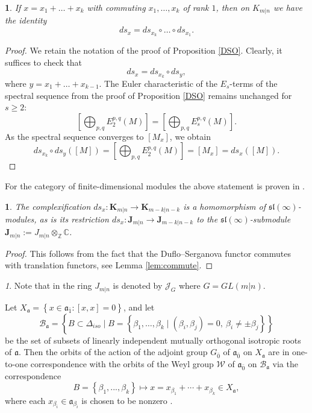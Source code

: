 \documentclass[12pt,oneside,english]{amsart}
\numberwithin{equation}{section}
\numberwithin{figure}{section}
\theoremstyle{plain}
\theoremstyle{plain}
\newtheorem{lem}[thm]{\protect\lemmaname}
\theoremstyle{remark}
\newtheorem{rem}[thm]{\protect\remarkname}
\theoremstyle{definition}
\theoremstyle{plain}
\theoremstyle{remark}
\theoremstyle{definition}
\theoremstyle{plain}
\theoremstyle{plain}
\newtheorem{prop}[thm]{\protect\propositionname}
\theoremstyle{definition}
\providecommand{\lemmaname}{Lemma}
\providecommand{\propositionname}{Proposition}
\providecommand{\remarkname}{Remark}
\newcommand{\bK}{\mathbf{K}}
\newcommand{\bJ}{\mathbf{J}}
\newcommand{\fa}{\mathfrak{a}}
\begin{document}
  \begin{lem}\label{lem:fin-dim} If $x=x_1+\dots+x_k$ with commuting $x_1,\dots,x_k$ of rank $1$, then on $K_{m|n}$ we have the identity
  $$ds_x=ds_{x_k}\circ\dots\circ ds_{x_1}.$$
\end{lem}
\begin{proof} We retain the notation of the proof of Proposition \ref{DSO}. Clearly, it suffices to check that
$$ds_x=ds_{x_k}\circ ds_y,$$  where  $y=x_1+\dots+x_{k-1}$.
  The Euler characteristic of the $E_s$-terms of the spectral sequence from the proof of Proposition \ref{DSO} remains unchanged for $s\geq 2$:
  $$[\bigoplus_{p,q}E_2^{p,q}(M)]=[\bigoplus_{p,q}E_s^{p,q}(M)].$$
   As the spectral sequence converges to  $[M_x]$, we obtain
  $$ds_{x_k}\circ ds_y([M])=[\bigoplus_{p,q}E_2^{p,q}(M)]=[M_x]=ds_x([M]).$$
\end{proof}
For the category of finite-dimensional modules the above statement is proven in \cite{HR}.


\begin{prop} The complexification $ds_x:\bK_{m|n}\rightarrow\bK_{m-k|n-k}$ is a homomorphism of $\mathfrak{sl}(\infty)$-modules, as is its restriction  $ds_x:\bJ_{m|n}\rightarrow\bJ_{m-k|n-k}$ to the $\mathfrak{sl}(\infty)$-submodule $\bJ_{m|n}:= J_{m|n}\otimes_{\mathbb Z}\mathbb C$.
\end{prop}

\begin{proof} This follows from the fact that the Duflo--Serganova functor commutes with translation functors, see Lemma \ref{lem:commute}.
  \end{proof}


\begin{rem}
 Note that in \cite{HR} the ring $J_{m|n}$ is denoted by $\mathcal{J}_G$ where $G=GL(m|n)$.
\end{rem}



Let $X_{\fa}=\left\{ x\in\fa_{\bar{1}}:\left[x,x\right]=0\right\} $,
and let \begin{equation}
\mathcal{B}_{\fa}=\left\{ B\subset\Delta_{iso}\mid B=\left\{ \beta_{1},\ldots,\beta_{k}\mid\left(\beta_{i},\beta_{j}\right)=0,\ \beta_{i}\ne\pm\beta_{j}\right\} \right\} \label{eq:iso}
\end{equation} be the set
of subsets of linearly independent mutually orthogonal isotropic roots of $\fa$.
Then the orbits of the action of the adjoint group $G_{\bar{0}}$ of $\fa_{\bar{0}}$ on $X_{\fa}$ are in one-to-one
correspondence with the  orbits of the Weyl group $\mathcal W$ of $\fa_{\bar{0}}$ on $\mathcal{B}_{\fa}$
via the correspondence
\begin{equation}
B=\left\{ \beta_{1},...,\beta_{k}\right\} \mapsto x=x_{\beta_{1}}+\cdots+x_{\beta_{k}}\in X_{\fa},\label{eq:bijection for x and B}
\end{equation}
where each $x_{\beta_{i}}\in\fa_{\beta_{i}}$
is chosen to be nonzero \cite[Theorem 4.2]{DS}.
\end{document}
